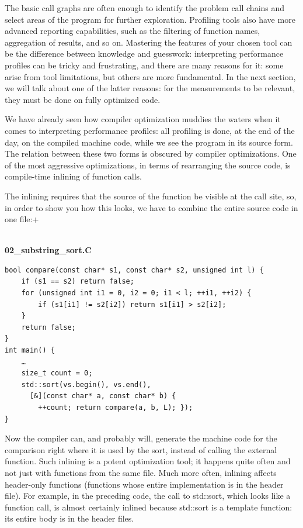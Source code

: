 The basic call graphs are often enough to identify the problem call chains and select areas of the program for further exploration. Profiling tools also have more advanced reporting capabilities, such as the filtering of function names, aggregation of results, and so on. Mastering the features of your chosen tool can be the difference between knowledge and guesswork: interpreting performance profiles can be tricky and frustrating, and there are many reasons for it: some arise from tool limitations, but others are more fundamental. In the next section, we will talk about one of the latter reasons: for the measurements to be relevant, they must be done on fully optimized code.


We have already seen how compiler optimization muddies the waters when it comes to interpreting performance profiles: all profiling is done, at the end of the day, on the compiled machine code, while we see the program in its source form. The relation between these two forms is obscured by compiler optimizations. One of the most aggressive optimizations, in terms of rearranging the source code, is compile-time inlining of function calls.

The inlining requires that the source of the function be visible at the call site, so, in order to show you how this looks, we have to combine the entire source code in one file:+

\hspace*{\fill} \\ %
\noindent
\textbf{02\_substring\_sort.C}
\begin{lstlisting}[style=styleCXX]
bool compare(const char* s1, const char* s2, unsigned int l) {
	if (s1 == s2) return false;
	for (unsigned int i1 = 0, i2 = 0; i1 < l; ++i1, ++i2) {
		if (s1[i1] != s2[i2]) return s1[i1] > s2[i2];
	}
	return false;
}
int main() {
	…
	size_t count = 0;
	std::sort(vs.begin(), vs.end(),
	  [&](const char* a, const char* b) {
		++count; return compare(a, b, L); });
}
\end{lstlisting}

Now the compiler can, and probably will, generate the machine code for the comparison right where it is used by the sort, instead of calling the external function. Such inlining is a potent optimization tool; it happens quite often and not just with functions from the same file. Much more often, inlining affects header-only functions (functions whose entire implementation is in the header file). For example, in the preceding code, the call to std::sort, which looks like a function call, is almost certainly inlined because std::sort is a template function: its entire body is in the header files.

